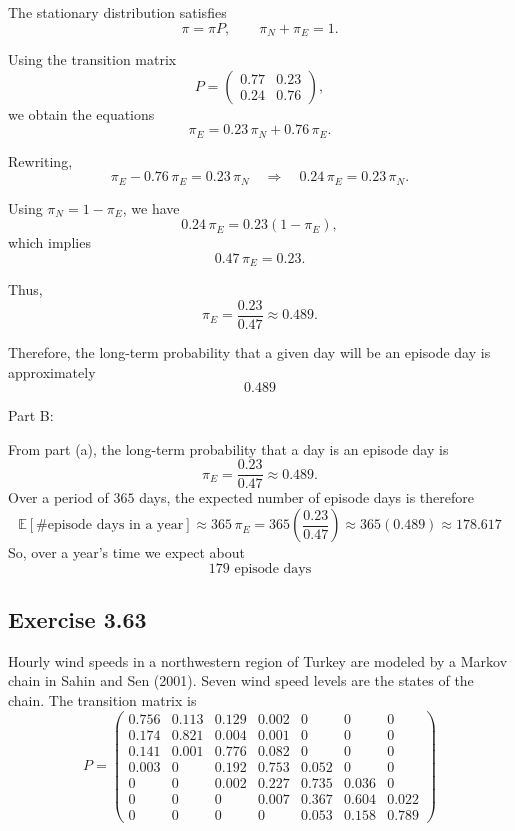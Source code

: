 \documentclass[hidelinks]{article}
\begin{document}
\smallskip

\noindent The stationary distribution satisfies
\[
\pi = \pi P,
\qquad
\pi_N + \pi_E = 1.
\]

\noindent Using the transition matrix
\[
P =
\begin{pmatrix}
0.77 & 0.23 \\
0.24 & 0.76
\end{pmatrix},
\]
\noindent we obtain the equations
\[
\pi_E = 0.23\,\pi_N + 0.76\,\pi_E.
\]

\noindent Rewriting,
\[
\pi_E - 0.76\,\pi_E = 0.23\,\pi_N
\quad \Longrightarrow \quad
0.24\,\pi_E = 0.23\,\pi_N.
\]

\noindent Using $\pi_N = 1 - \pi_E$, we have
\[
0.24\,\pi_E = 0.23(1 - \pi_E),
\]
which implies
\[
0.47\,\pi_E = 0.23.
\]

\noindent Thus,
\[
\pi_E = \frac{0.23}{0.47} \approx 0.489.
\]

\noindent Therefore, the long-term probability that a given day will be an episode day is approximately
\[
\boxed{0.489}
\]

\noindent Part B:

\noindent From part (a), the long-term probability that a day is an episode day is
\[
\pi_E = \frac{0.23}{0.47} \approx 0.489.
\]
Over a period of $365$ days, the expected number of episode days is therefore
\[
\mathbb{E}[\text{\# episode days in a year}]
\approx 365 \,\pi_E
= 365\left(\frac{0.23}{0.47}\right)
\approx 365(0.489)
\approx 178.617
\]
So, over a year's time we expect about
\[
\boxed{179 \text{ episode days}}
\]

\subsection{Exercise 3.63}

Hourly wind speeds in a northwestern region of Turkey are modeled by a Markov chain
in Sahin and Sen (2001). Seven wind speed levels are the states of the chain.
The transition matrix is
\[
P =
\begin{pmatrix}
0.756 & 0.113 & 0.129 & 0.002 & 0     & 0     & 0     \\
0.174 & 0.821 & 0.004 & 0.001 & 0     & 0     & 0     \\
0.141 & 0.001 & 0.776 & 0.082 & 0     & 0     & 0     \\
0.003 & 0     & 0.192 & 0.753 & 0.052 & 0     & 0     \\
0     & 0     & 0.002 & 0.227 & 0.735 & 0.036 & 0     \\
0     & 0     & 0     & 0.007 & 0.367 & 0.604 & 0.022 \\
0     & 0     & 0     & 0     & 0.053 & 0.158 & 0.789
\end{pmatrix}
\]
\end{document}
